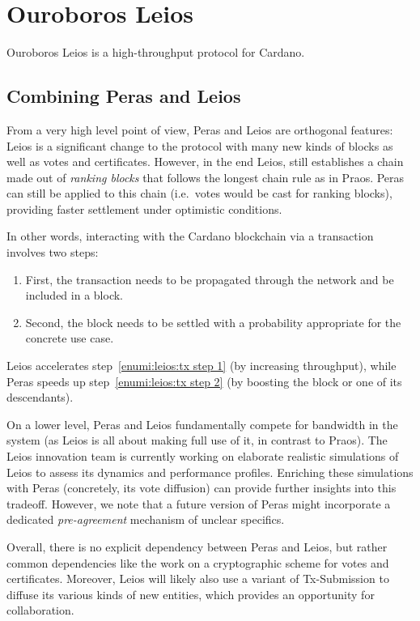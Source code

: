 \section{Ouroboros Leios}

Ouroboros Leios is a high-throughput protocol for Cardano.

\subsection{Combining Peras and Leios}

From a very high level point of view, Peras and Leios are orthogonal features:
Leios is a significant change to the protocol with many new kinds of blocks as well as votes and certificates.
However, in the end Leios, still establishes a chain made out of \emph{ranking blocks} that follows the longest chain rule as in Praos.
Peras can still be applied to this chain (i.e.\ votes would be cast for ranking blocks), providing faster settlement under optimistic conditions.

In other words, interacting with the Cardano blockchain via a transaction involves two steps:
\begin{enumerate}
\item\label{enumi:leios:tx step 1}
  First, the transaction needs to be propagated through the network and be included in a block.
\item\label{enumi:leios:tx step 2}
  Second, the block needs to be settled with a probability appropriate for the concrete use case.
\end{enumerate}
Leios accelerates step~\ref{enumi:leios:tx step 1} (by increasing throughput), while Peras speeds up step~\ref{enumi:leios:tx step 2} (by boosting the block or one of its descendants).

On a lower level, Peras and Leios fundamentally compete for bandwidth in the system (as Leios is all about making full use of it, in contrast to Praos).
The Leios innovation team is currently working on elaborate realistic simulations of Leios to assess its dynamics and performance profiles.
Enriching these simulations with Peras (concretely, its vote diffusion) can provide further insights into this tradeoff.
However, we note that a future version of Peras might incorporate a dedicated \emph{pre-agreement} mechanism of unclear specifics.

Overall, there is no explicit dependency between Peras and Leios, but rather common dependencies like the work on a cryptographic scheme for votes and certificates.
Moreover, Leios will likely also use a variant of Tx-Submission to diffuse its various kinds of new entities, which provides an opportunity for collaboration.


